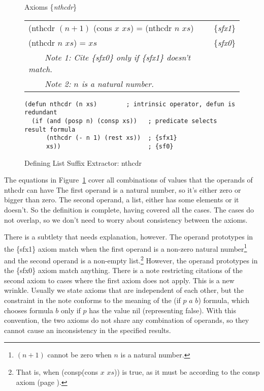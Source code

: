 \begin{figure}
\begin{center}
Axioms \{\emph{nthcdr}\} \\
\begin{tabular}{ll}
(nthcdr $(n+1)$ (cons $x$ $xs$) = (nthcdr $n$ $xs$) & \{\emph{sfx1}\}   \\
(nthcdr $n$ $xs$) = $xs$                            & \{\emph{sfx0}\}   \\
~~~~\emph{Note 1: Cite \{\emph{sfx0}\} only if \{\emph{sfx1}\} doesn't match.}&\\
~~~~\emph{Note 2: $n$ is a natural number.}
\end{tabular}
\begin{Verbatim}
(defun nthcdr (n xs)        ; intrinsic operator, defun is redundant
  (if (and (posp n) (consp xs))   ; predicate selects result formula
      (nthcdr (- n 1) (rest xs))  ; {sfx1}
      xs))                        ; {sf0}
\end{Verbatim}
\end{center}
\caption{Defining List Suffix Extractor: nthcdr}
\label{fig:nthcdr-defun}
\end{figure}


The equations in Figure~\ref{fig:nthcdr-defun} cover all combinations
of values that the operands of nthcdr can have
The first operand is a natural number,
so it's either zero or bigger than zero.
The second operand, a list, either has some elements or it doesn't.
So the definition is complete, having covered all the cases.
The cases do not overlap, so we don't need to worry about
consistency between the axioms.

There is a subtlety that needs explanation, however.
The operand prototypes in the
\{sfx1\} axiom match when the first operand is a non-zero natural number\footnote{$(n+1)$
cannot be zero when $n$ is a natural number.}
and the second operand is a non-empty list.\footnote{That
is, when (consp(cons $x$ $xs$)) is true,
as it must be according to the consp axiom (page \pageref{consp-axiom}).}
However, the operand prototypes in the \{sfx0\} axiom match anything.
There is a note restricting
citations of the second axiom to cases
where the first axiom does not apply.
This is a new wrinkle.
Usually we state axioms that are independent of each other,
but the constraint in the note conforms to the meaning
of the (if $p$ $a$ $b$) formula, which chooses formula $b$
only if $p$ has the value nil (representing false).
With this convention, the two axioms
do not share any combination of operands, so they cannot
cause an inconsistency in the specified results.

